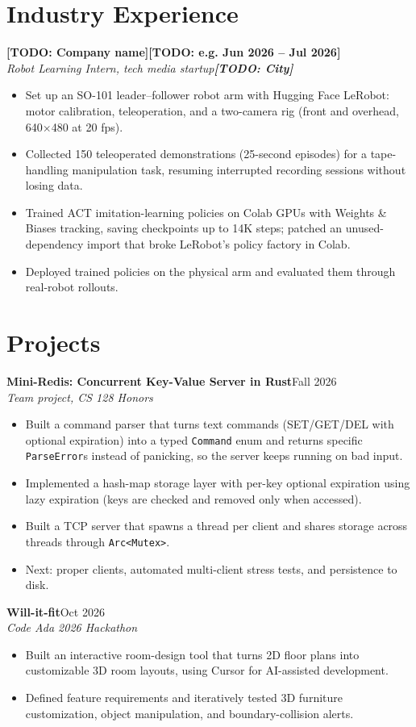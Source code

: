 \documentclass[11pt,letterpaper]{article}
\newcommand{\entry}[4]{%
  \par\vspace{3pt}\noindent
  \textbf{#1}\hfill #2\\
  \textit{#3}\hfill\textit{#4}\par}
\newcommand{\todo}[1]{\textbf{[TODO: #1]}}
\begin{document}
\section*{Industry Experience}
\entry{\todo{Company name}}{\todo{e.g. Jun 2026 -- Jul 2026}}
      {Robot Learning Intern, tech media startup}{\todo{City}}
\begin{itemize}
  \item Set up an SO-101 leader--follower robot arm with Hugging Face LeRobot: motor calibration,
        teleoperation, and a two-camera rig (front and overhead, 640$\times$480 at 20 fps).
  \item Collected 150 teleoperated demonstrations (25-second episodes) for a tape-handling
        manipulation task, resuming interrupted recording sessions without losing data.
  \item Trained ACT imitation-learning policies on Colab GPUs with Weights \& Biases tracking,
        saving checkpoints up to 14K steps; patched an unused-dependency import that broke
        LeRobot's policy factory in Colab.
  \item Deployed trained policies on the physical arm and evaluated them through real-robot rollouts.
\end{itemize}

\section*{Projects}
\entry{Mini-Redis: Concurrent Key-Value Server in Rust}{Fall 2026}
      {Team project, CS 128 Honors}{}
\begin{itemize}
  \item Built a command parser that turns text commands (SET/GET/DEL with optional expiration)
        into a typed \texttt{Command} enum and returns specific \texttt{ParseError}s instead of
        panicking, so the server keeps running on bad input.
  \item Implemented a hash-map storage layer with per-key optional expiration using lazy
        expiration (keys are checked and removed only when accessed).
  \item Built a TCP server that spawns a thread per client and shares storage across threads
        through \texttt{Arc<Mutex>}.
  \item Next: proper clients, automated multi-client stress tests, and persistence to disk.
\end{itemize}

\entry{Will-it-fit}{Oct 2026}{Code Ada 2026 Hackathon}{}
\begin{itemize}
  \item Built an interactive room-design tool that turns 2D floor plans into customizable 3D room
        layouts, using Cursor for AI-assisted development.
  \item Defined feature requirements and iteratively tested 3D furniture customization, object
        manipulation, and boundary-collision alerts.
\end{itemize}
\end{document}
